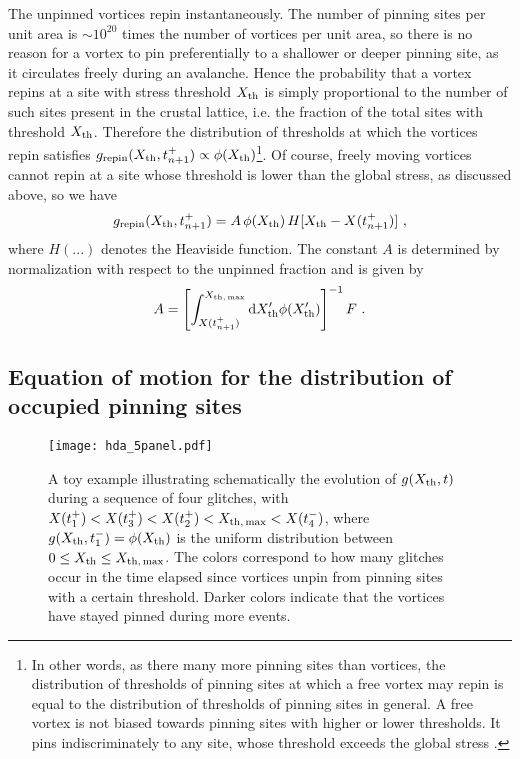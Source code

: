 The unpinned vortices repin instantaneously. The number of pinning sites per unit area is $\sim10^{20}$ times the number of vortices per unit area, so there is no reason for a vortex to pin preferentially to a shallower or deeper pinning site, as it circulates freely during an avalanche. Hence the probability that a vortex repins at a site with stress threshold $X_{\rm th}$ is simply proportional to the number of such sites present in the crustal lattice, i.e. the fraction of the total sites with threshold $X_{\rm th}$. Therefore the distribution of thresholds at which the vortices repin satisfies $g_{\rm repin}(X_{\rm th}, t_{n+1}^+) \propto \phi(X_{\rm th})$\footnote{In other words, as there many more pinning sites than vortices, the distribution of thresholds of pinning sites at which a free vortex may repin is equal to the distribution of thresholds of pinning sites in general. A free vortex is not biased towards pinning sites with higher or lower thresholds. It pins indiscriminately to any site, whose threshold exceeds the global stress \citep{Haskell2016a}.}. Of course, freely moving vortices cannot repin at a site whose threshold is lower than the global stress, as discussed above, so we have
\begin{align}
g_{\rm repin}(X_{\rm th}, t_{n+1}^+) = A\, \phi(X_{\rm th})\, H[X_{\rm th} - X(t_{n+1}^+)]\ , \label{eq:hda_grepin}
\end{align}
where $H(...)$ denotes the Heaviside function. The constant $A$ is determined by normalization with respect to the unpinned fraction and is given by
\begin{align}
A = \left[\int_{X(t_{n+1}^+)}^{X_{\rm th,\,max}} \textrm{d} X_{\rm th}' \phi(X_{\rm th}') \right]^{-1} F\ . \label{eq:hda_anorm}
\end{align}

\vspace{1em}
\subsection{Equation of motion for the distribution of occupied pinning sites} \label{sec:hda_eom}

\begin{figure*}
\centering
\texttt{[image: hda\_5panel.pdf]}
\caption{A toy example illustrating schematically the evolution of $g(X_{\rm th}, t)$ during a sequence of four glitches, with $X(t_1^+) < X(t_3^+) < X(t_2^+) < X_{\rm th,\,max} < X(t_4^-)$, where $g(X_{\rm th}, t_1^-) = \phi(X_{\rm th})$ is the uniform distribution between $0 \leq X_{\rm th} \leq X_{\rm th,\,max}$. The colors correspond to how many glitches occur in the time elapsed since vortices unpin from pinning sites with a certain threshold. Darker colors indicate that the vortices have stayed pinned during more events. \label{fig:hda_g_illust}}
\end{figure*}

